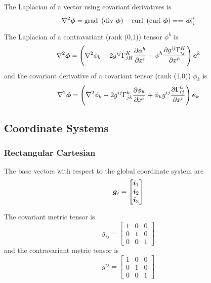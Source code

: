 The Laplacian of a vector using covariant derivatives is
\begin{equation}
  \laplacian{\vect{\phi}}=\text{grad }\pbrac{\text{div }\vect{\phi}}-\text{curl } \pbrac{\text{curl }\vect{\phi}}==\mixedderiv{\vect{\phi}}{i}{i}
\end{equation}

The Laplacian of a contravariant (rank (0,1)) tensor $\phi^{k}$ is
\begin{equation}
  \laplacian{\vect{\phi}}=\pbrac{\laplacian{\phi_{k}}-2g^{ij}\christoffel{K}{j}{H}\delby{\phi^{h}}{x^{i}}+\phi^{h}\delby{g^{ij}\christoffel{K}{i}{j}}{x^{h}}}\vect{e}^{k}
\end{equation}
and the covariant derivative of a covariant tensor  (rank (1,0)) $\phi_{k}$ is
\begin{equation}
  \laplacian{\vect{\phi}}=\pbrac{\laplacian{\phi_{k}}-2g^{ij}\christoffel{h}{j}{k}\delby{\phi_{h}}{x^{i}}+\phi_{h}g^{ij}\delby{\christoffel{h}{i}{j}}{x^{i}}}\vect{e}_{k}
\end{equation}

\subsection{Coordinate Systems}
\label{sec:coordinate systems}

\subsubsection{Rectangular Cartesian}

The base vectors with respect to the global coordinate system are
\begin{equation}
  \vect{g}_{i}=\begin{bmatrix} 
    \vect{i}_{1} \\ 
    \vect{i}_{2} \\
    \vect{i}_{3} 
  \end{bmatrix}
\end{equation}

The covariant metric tensor is
\begin{equation}
  g_{ij}=\begin{bmatrix}
    1 & 0 & 0 \\
    0 & 1 & 0 \\
    0 & 0 & 1
  \end{bmatrix}
\end{equation}
and the contravariant metric tensor is
\begin{equation}
  g^{ij}=\begin{bmatrix}
    1 & 0 & 0 \\
    0 & 1 & 0 \\
    0 & 0 & 1
  \end{bmatrix}
\end{equation}

